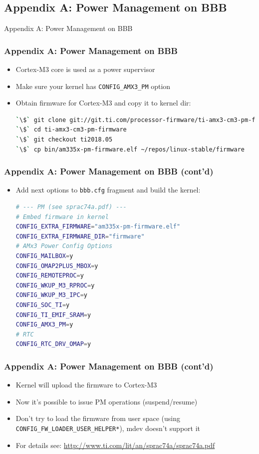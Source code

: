 \documentclass[aspectratio=169,usenames,dvipsnames]{beamer}
\newcounter{cont}
\begin{document}
\subsection{Appendix A: Power Management on BBB}

\begin{frame}[standout]
  Appendix A: Power Management on BBB
\end{frame}

\begin{frame}[containsverbatim]
  \frametitle{Appendix A: Power Management on BBB}
  \begin{itemize}
    \item Cortex-M3 core is used as a power supervisor
    \item Make sure your kernel has \texttt{CONFIG\_AMX3\_PM} option
    \item Obtain firmware for Cortex-M3 and copy it to kernel dir:
      \begin{lstlisting}[language=bash,numbers=none]
`\$` git clone git://git.ti.com/processor-firmware/ti-amx3-cm3-pm-firmware.git
`\$` cd ti-amx3-cm3-pm-firmware
`\$` git checkout ti2018.05
`\$` cp bin/am335x-pm-firmware.elf ~/repos/linux-stable/firmware
      \end{lstlisting}
  \end{itemize}
\end{frame}

\begin{frame}[containsverbatim]
  \frametitle{Appendix A: Power Management on BBB (cont'd)}
  \begin{itemize}
    \item Add next options to \texttt{bbb.cfg} fragment and build the kernel:
      \begin{lstlisting}[language=bash,numbers=none]
# --- PM (see sprac74a.pdf) ---
# Embed firmware in kernel
CONFIG_EXTRA_FIRMWARE="am335x-pm-firmware.elf"
CONFIG_EXTRA_FIRMWARE_DIR="firmware"
# AMx3 Power Config Options
CONFIG_MAILBOX=y
CONFIG_OMAP2PLUS_MBOX=y
CONFIG_REMOTEPROC=y
CONFIG_WKUP_M3_RPROC=y
CONFIG_WKUP_M3_IPC=y
CONFIG_SOC_TI=y
CONFIG_TI_EMIF_SRAM=y
CONFIG_AMX3_PM=y
# RTC
CONFIG_RTC_DRV_OMAP=y
      \end{lstlisting}
  \end{itemize}
\end{frame}

\begin{frame}[containsverbatim]
  \frametitle{Appendix A: Power Management on BBB (cont'd)}
  \begin{itemize}
    \item Kernel will upload the firmware to Cortex-M3
    \item Now it's possible to issue PM operations (suspend/resume)
    \item Don't try to load the firmware from user space (using
          \texttt{CONFIG\_FW\_LOADER\_USER\_HELPER*}), mdev doesn't support it
    \item For details see:
          \url{http://www.ti.com/lit/an/sprac74a/sprac74a.pdf}
  \end{itemize}
\end{frame}
\end{document}
